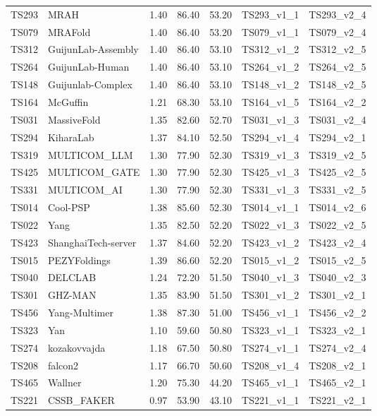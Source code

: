 \begin{longtable}{lllllll}
TS293 & MRAH & 1.40 & 86.40 & 53.20 & TS293\_v1\_1 & TS293\_v2\_4 \\ 
TS079 & MRAFold & 1.40 & 86.40 & 53.20 & TS079\_v1\_1 & TS079\_v2\_4 \\ 
TS312 & GuijunLab-Assembly & 1.40 & 86.40 & 53.10 & TS312\_v1\_2 & TS312\_v2\_5 \\ 
TS264 & GuijunLab-Human & 1.40 & 86.40 & 53.10 & TS264\_v1\_2 & TS264\_v2\_5 \\ 
TS148 & Guijunlab-Complex & 1.40 & 86.40 & 53.10 & TS148\_v1\_2 & TS148\_v2\_5 \\ 
TS164 & McGuffin & 1.21 & 68.30 & 53.10 & TS164\_v1\_5 & TS164\_v2\_2 \\ 
TS031 & MassiveFold & 1.35 & 82.60 & 52.70 & TS031\_v1\_3 & TS031\_v2\_4 \\ 
TS294 & KiharaLab & 1.37 & 84.10 & 52.50 & TS294\_v1\_4 & TS294\_v2\_1 \\ 
TS319 & MULTICOM\_LLM & 1.30 & 77.90 & 52.30 & TS319\_v1\_3 & TS319\_v2\_5 \\ 
TS425 & MULTICOM\_GATE & 1.30 & 77.90 & 52.30 & TS425\_v1\_3 & TS425\_v2\_5 \\ 
TS331 & MULTICOM\_AI & 1.30 & 77.90 & 52.30 & TS331\_v1\_3 & TS331\_v2\_5 \\ 
TS014 & Cool-PSP & 1.38 & 85.60 & 52.30 & TS014\_v1\_1 & TS014\_v2\_6 \\ 
TS022 & Yang & 1.35 & 82.50 & 52.20 & TS022\_v1\_3 & TS022\_v2\_5 \\ 
TS423 & ShanghaiTech-server & 1.37 & 84.60 & 52.20 & TS423\_v1\_2 & TS423\_v2\_4 \\ 
TS015 & PEZYFoldings & 1.39 & 86.60 & 52.20 & TS015\_v1\_2 & TS015\_v2\_5 \\ 
TS040 & DELCLAB & 1.24 & 72.20 & 51.50 & TS040\_v1\_3 & TS040\_v2\_3 \\ 
TS301 & GHZ-MAN & 1.35 & 83.90 & 51.50 & TS301\_v1\_2 & TS301\_v2\_1 \\ 
TS456 & Yang-Multimer & 1.38 & 87.30 & 51.00 & TS456\_v1\_1 & TS456\_v2\_2 \\ 
TS323 & Yan & 1.10 & 59.60 & 50.80 & TS323\_v1\_1 & TS323\_v2\_1 \\ 
TS274 & kozakovvajda & 1.18 & 67.50 & 50.80 & TS274\_v1\_1 & TS274\_v2\_4 \\ 
TS208 & falcon2 & 1.17 & 66.70 & 50.60 & TS208\_v1\_4 & TS208\_v2\_1 \\ 
TS465 & Wallner & 1.20 & 75.30 & 44.20 & TS465\_v1\_1 & TS465\_v2\_1 \\ 
TS221 & CSSB\_FAKER & 0.97 & 53.90 & 43.10 & TS221\_v1\_1 & TS221\_v2\_1 \\ 

\end{longtable}
